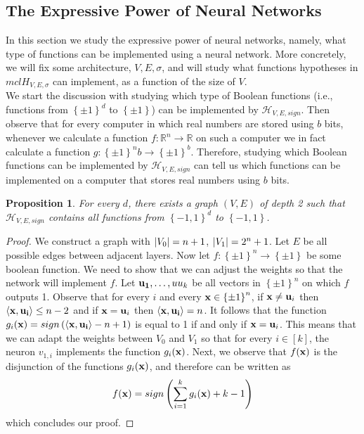 \documentclass[12pt]{report}
\theoremstyle{plain}
\newtheorem{proposition}{Proposition}[chapter]
\newcommand\mcl[1]{\mathcal{#1}}
\newcommand\sprod[2]{\langle \vb{#1},\vb{#2}\rangle}
\begin{document}
\begin{flushleft}
\section{The Expressive Power of Neural Networks}
In this section we study the expressive power of neural networks, namely, what type of functions can be implemented using a neural network. More concretely, we will fix some architecture, $V,E,\sigma$, and will study what functions hypotheses in $mcl{H}_{V,E,\sigma}$
can implement, as a function of the size of $V$.\\
We start the discussion with studying which type of Boolean functions (i.e., functions from $\left\{\pm 1\right\}^d$ to $\left\{\pm 1\right\}$) can be implemented by $\mcl{H}_{V,E,sign}$. Then observe that for every computer in which real numbers are stored using $b$ bits, whenever we calculate a function $f:\mathds{R}^n\to\mathds{R}$ on such a computer we in fact calculate a function $g:\left\{\pm 1\right\}^nb\to\left\{\pm 1\right\}^b$. Therefore, studying which Boolean functions can be implemented by $\mcl{H}_{V,E,sign}$ can tell us which functions can be implemented on a computer that stores real numbers using $b$ bits.
\begin{proposition}
	For every $d$, there exists a graph $(V,E)$  of depth 2 such that $\mcl{H}_{V,E,sign}$ contains all functions from $\left\{-1,1\right\}^d$ to $\left\{-1,1\right\}$.
\end{proposition}
\begin{proof}
	We construct a graph with $\abs{V_0}=n+1$, $\abs{V_1}=2^n+1$. Let $E$ be all possible edges between adjacent layers. Now let $f:\left\{\pm 1\right\}^n\to\left\{\pm 1\right\}$ be some boolean function. We need to show that we can adjust the weights so that the network will implement $f$. Let $\vb{u_1},\dots,u{u_k}$ be all vectors in $\left\{\pm 1\right\}^n$ on which $f$ outputs 1. Observe that for every $i$ and every $\vb{x}\in\left\{\pm 1\right\}^n$, if $\vb{x}\neq\vb{u}_i$ then $\sprod{x}{u_i}\leq n-2$ and if $\vb{x}=\vb{u}_i$ then $\sprod{x}{u_i}=n$. It follows that the function $g_i(\vb{x})=sign\left(\sprod{x}{u_i}-n+1\right)$ is equal to 1 if and only if $\vb{x}=\vb{u}_i$. This means that we can adapt the weights between $V_0$ and $V_1$ so that for every $i\in[k]$, the neuron $v_{1,i}$ implements the function $g_i(\vb{x})$. Next, we observe that $f(\vb{x})$ is the disjunction of the functions $g_i(\vb{x})$, and therefore can be written as 
	\[ f(\vb{x})=sign\left(\sum_{i=1}^k g_i(\vb{x})+k-1\right) \]
	which concludes our proof.
\end{proof}

\end{flushleft}
\end{document}

